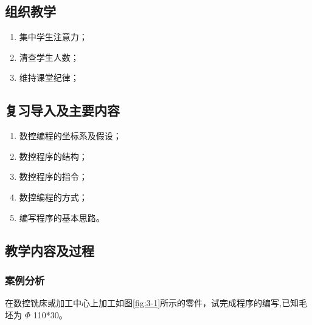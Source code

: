 \jxhj{%
	}

\makeshouye %

\subsection{组织教学}
\begin{enumerate}[1、]
	\item 集中学生注意力；
	\item 清查学生人数；
	\item 维持课堂纪律；
\end{enumerate}
\subsection{复习导入及主要内容}
\begin{enumerate}[1、]
    \item 数控编程的坐标系及假设；
    \item 数控程序的结构；
    \item 数控程序的指令；
    \item 数控编程的方式；
    \item 编写程序的基本思路。
\end{enumerate}
\subsection{教学内容及过程}
\subsubsection{案例分析}

在数控铣床或加工中心上加工如图\ref{fig:3-1}所示的零件，试完成程序的编写,已知毛坯为 $\Phi$ 110*30。

